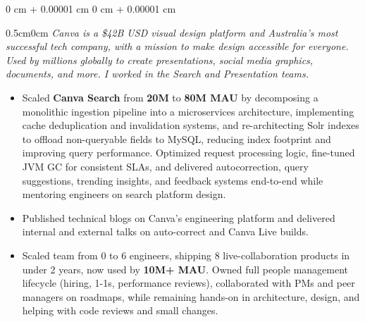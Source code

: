\documentclass[10pt, letterpaper]{article}
\newenvironment{highlights}{
    \begin{itemize}[
        topsep=0.10 cm,
        parsep=0.10 cm,
        partopsep=0pt,
        itemsep=0pt,
        leftmargin=0 cm + 10pt
    ]
}{
    \end{itemize}
} %
\newenvironment{onecolentry}{
    \begin{adjustwidth}{
        0 cm + 0.00001 cm
    }{
        0 cm + 0.00001 cm
    }
}{
    \end{adjustwidth}
} %
\begin{document}
        \vspace{0.10 cm}
        \begin{onecolentry}
            \begin{adjustwidth}{0.5cm}{0cm}
            \textit{Canva is a \$42B USD visual design platform and Australia's most successful tech company, with a mission to make design accessible for everyone. Used by millions globally to create presentations, social media graphics, documents, and more. I worked in the Search and Presentation teams.}
            \end{adjustwidth}

            \vspace{0.10 cm}
            \begin{highlights}
                \item Scaled \textbf{Canva Search} from \textbf{20M} to \textbf{80M MAU} by decomposing a monolithic ingestion pipeline into a microservices architecture, implementing cache deduplication and invalidation systems, and re-architecting Solr indexes to offload non-queryable fields to MySQL, reducing index footprint and improving query performance. Optimized request processing logic, fine-tuned JVM GC for consistent SLAs, and delivered autocorrection, query suggestions, trending insights, and feedback systems end-to-end while mentoring engineers on search platform design.
                \item Published technical blogs on Canva's engineering platform and delivered internal and external talks on auto-correct and Canva Live builds.
                \item Scaled team from 0 to 6 engineers, shipping 8 live-collaboration products in under 2 years, now used by \textbf{10M+ MAU}. Owned full people management lifecycle (hiring, 1-1s, performance reviews), collaborated with PMs and peer managers on roadmaps, while remaining hands-on in architecture, design, and helping with code reviews and small changes.
            \end{highlights}
        \end{onecolentry}
\end{document}
